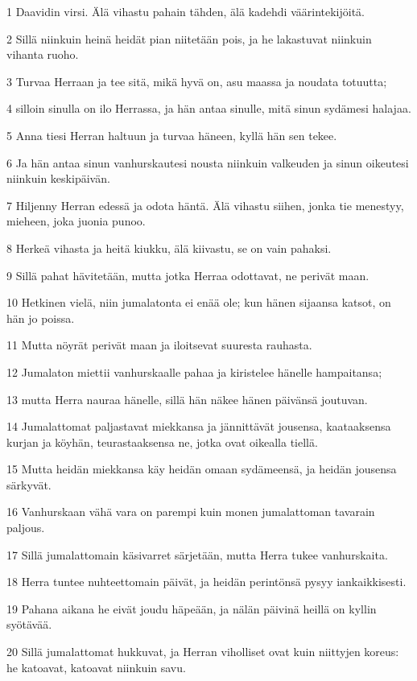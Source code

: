 \par 1 Daavidin virsi. Älä vihastu pahain tähden, älä kadehdi väärintekijöitä.
\par 2 Sillä niinkuin heinä heidät pian niitetään pois, ja he lakastuvat niinkuin vihanta ruoho.
\par 3 Turvaa Herraan ja tee sitä, mikä hyvä on, asu maassa ja noudata totuutta;
\par 4 silloin sinulla on ilo Herrassa, ja hän antaa sinulle, mitä sinun sydämesi halajaa.
\par 5 Anna tiesi Herran haltuun ja turvaa häneen, kyllä hän sen tekee.
\par 6 Ja hän antaa sinun vanhurskautesi nousta niinkuin valkeuden ja sinun oikeutesi niinkuin keskipäivän.
\par 7 Hiljenny Herran edessä ja odota häntä. Älä vihastu siihen, jonka tie menestyy, mieheen, joka juonia punoo.
\par 8 Herkeä vihasta ja heitä kiukku, älä kiivastu, se on vain pahaksi.
\par 9 Sillä pahat hävitetään, mutta jotka Herraa odottavat, ne perivät maan.
\par 10 Hetkinen vielä, niin jumalatonta ei enää ole; kun hänen sijaansa katsot, on hän jo poissa.
\par 11 Mutta nöyrät perivät maan ja iloitsevat suuresta rauhasta.
\par 12 Jumalaton miettii vanhurskaalle pahaa ja kiristelee hänelle hampaitansa;
\par 13 mutta Herra nauraa hänelle, sillä hän näkee hänen päivänsä joutuvan.
\par 14 Jumalattomat paljastavat miekkansa ja jännittävät jousensa, kaataaksensa kurjan ja köyhän, teurastaaksensa ne, jotka ovat oikealla tiellä.
\par 15 Mutta heidän miekkansa käy heidän omaan sydämeensä, ja heidän jousensa särkyvät.
\par 16 Vanhurskaan vähä vara on parempi kuin monen jumalattoman tavarain paljous.
\par 17 Sillä jumalattomain käsivarret särjetään, mutta Herra tukee vanhurskaita.
\par 18 Herra tuntee nuhteettomain päivät, ja heidän perintönsä pysyy iankaikkisesti.
\par 19 Pahana aikana he eivät joudu häpeään, ja nälän päivinä heillä on kyllin syötävää.
\par 20 Sillä jumalattomat hukkuvat, ja Herran viholliset ovat kuin niittyjen koreus: he katoavat, katoavat niinkuin savu.
